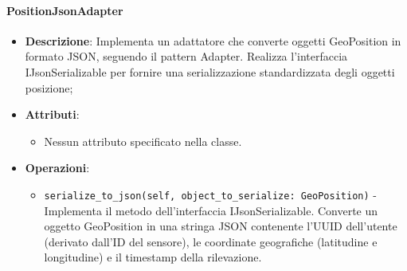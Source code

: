 \documentclass[10pt]{article}
\begin{document}
    \paragraph{PositionJsonAdapter}
    \begin{itemize} 
    \item \textbf{Descrizione}: Implementa un adattatore che converte oggetti GeoPosition in formato JSON, seguendo il pattern Adapter. Realizza l'interfaccia IJsonSerializable per fornire una serializzazione standardizzata degli oggetti posizione;
    \item \textbf{Attributi}:
    \begin{itemize}
        \item Nessun attributo specificato nella classe.
    \end{itemize}
    
    \item \textbf{Operazioni}:
    \begin{itemize}
        \item \texttt{serialize\_to\_json(self, object\_to\_serialize: GeoPosition)} - Implementa il metodo dell'interfaccia IJsonSerializable. Converte un oggetto GeoPosition in una stringa JSON contenente l'UUID dell'utente (derivato dall'ID del sensore), le coordinate geografiche (latitudine e longitudine) e il timestamp della rilevazione.
    \end{itemize}
    \end{itemize}
\end{document}
